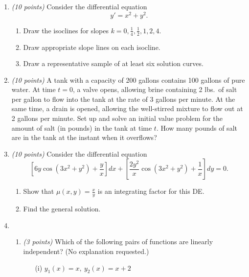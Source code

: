 \documentclass[12pt]{article}
\begin{document}
\begin{enumerate}

\item
{\em (10 points)}
Consider the differential equation
$$
y' = x^2 +y^2.
$$

\vspace*{.2in}

\begin{enumerate}
\item
Draw the isoclines for slopes $k = 0, \frac{1}{4}, \frac{1}{2}, 1, 2,4.$

\item
Draw appropriate slope lines on each isocline.

\item
Draw a representative sample of at least six solution curves.
\end{enumerate}

\newpage

\item
{\em (10 points)}
A tank with a capacity of 200 gallons contains 100 gallons of pure water. At time $t=0$, a valve opens, allowing brine containing 2 lbs.~of salt per gallon to flow into the tank at the rate of 3 gallons per minute. At the same time, a drain is opened, allowing the well-stirred mixture to flow out at 2 gallons per minute. Set up and solve an initial value problem for the amount of salt (in pounds) in the tank at time $t$. How many pounds of salt are in the tank at the instant when it overflows?

\newpage

\item
{\em (10 points)}
Consider the differential equation
$$
\left[6y \cos(3x^2+y^2)+ \frac{y}{x}\right]dx + \left[\frac{2y^2}{x} \cos (3x^2 + y^2)
+ \frac{1}{x}\right] dy =0.
$$

\begin{enumerate}
\item
Show that $\mu(x,y) = \frac{x}{y}$ is an integrating factor for this DE.

\vspace*{2in}

\item
Find the general solution.
\end{enumerate}

\newpage

\item

\begin{enumerate}
\item
{\em (3 points)}
Which of the following pairs of functions are linearly independent? (No explanation requested.)
\begin{enumerate}
\item[(i)]
$y_1(x) = x, \ y_2 (x) = x+2$


\end{enumerate}
\end{enumerate}
\end{enumerate}
\end{document}
